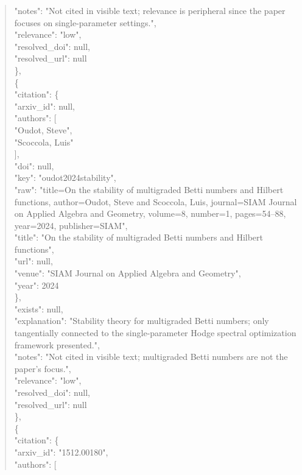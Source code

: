 \documentclass[11pt]{article}
\begin{document}
\begin{quote}
      "notes": "Not cited in visible text; relevance is peripheral since the paper focuses on single-parameter settings.",\\
      "relevance": "low",\\
      "resolved\_doi": null,\\
      "resolved\_url": null\\
    \},\\
    \{\\
      "citation": \{\\
        "arxiv\_id": null,\\
        "authors": [\\
          "Oudot, Steve",\\
          "Scoccola, Luis"\\
        ],\\
        "doi": null,\\
        "key": "oudot2024stability",\\
        "raw": "title=On the stability of multigraded Betti numbers and Hilbert functions, author=Oudot, Steve and Scoccola, Luis, journal=SIAM Journal on Applied Algebra and Geometry, volume=8, number=1, pages=54--88, year=2024, publisher=SIAM",\\
        "title": "On the stability of multigraded Betti numbers and Hilbert functions",\\
        "url": null,\\
        "venue": "SIAM Journal on Applied Algebra and Geometry",\\
        "year": 2024\\
      \},\\
      "exists": null,\\
      "explanation": "Stability theory for multigraded Betti numbers; only tangentially connected to the single-parameter Hodge spectral optimization framework presented.",\\
      "notes": "Not cited in visible text; multigraded Betti numbers are not the paper's focus.",\\
      "relevance": "low",\\
      "resolved\_doi": null,\\
      "resolved\_url": null\\
    \},\\
    \{\\
      "citation": \{\\
        "arxiv\_id": "1512.00180",\\
        "authors": [\\

\end{quote}
\end{document}

